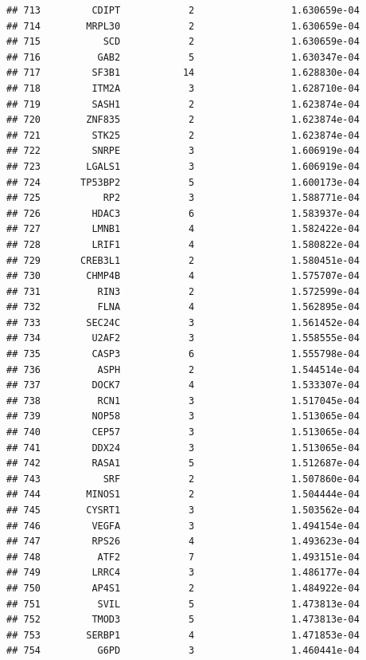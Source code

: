 \documentclass[
]{article}
\begin{document}
\begin{verbatim}
## 713         CDIPT            2                 1.630659e-04
## 714        MRPL30            2                 1.630659e-04
## 715           SCD            2                 1.630659e-04
## 716          GAB2            5                 1.630347e-04
## 717         SF3B1           14                 1.628830e-04
## 718         ITM2A            3                 1.628710e-04
## 719         SASH1            2                 1.623874e-04
## 720        ZNF835            2                 1.623874e-04
## 721         STK25            2                 1.623874e-04
## 722         SNRPE            3                 1.606919e-04
## 723        LGALS1            3                 1.606919e-04
## 724       TP53BP2            5                 1.600173e-04
## 725           RP2            3                 1.588771e-04
## 726         HDAC3            6                 1.583937e-04
## 727         LMNB1            4                 1.582422e-04
## 728         LRIF1            4                 1.580822e-04
## 729       CREB3L1            2                 1.580451e-04
## 730        CHMP4B            4                 1.575707e-04
## 731          RIN3            2                 1.572599e-04
## 732          FLNA            4                 1.562895e-04
## 733        SEC24C            3                 1.561452e-04
## 734         U2AF2            3                 1.558555e-04
## 735         CASP3            6                 1.555798e-04
## 736          ASPH            2                 1.544514e-04
## 737         DOCK7            4                 1.533307e-04
## 738          RCN1            3                 1.517045e-04
## 739         NOP58            3                 1.513065e-04
## 740         CEP57            3                 1.513065e-04
## 741         DDX24            3                 1.513065e-04
## 742         RASA1            5                 1.512687e-04
## 743           SRF            2                 1.507860e-04
## 744        MINOS1            2                 1.504444e-04
## 745        CYSRT1            3                 1.503562e-04
## 746         VEGFA            3                 1.494154e-04
## 747         RPS26            4                 1.493623e-04
## 748          ATF2            7                 1.493151e-04
## 749         LRRC4            3                 1.486177e-04
## 750         AP4S1            2                 1.484922e-04
## 751          SVIL            5                 1.473813e-04
## 752         TMOD3            5                 1.473813e-04
## 753        SERBP1            4                 1.471853e-04
## 754          G6PD            3                 1.460441e-04

\end{verbatim}
\end{document}
